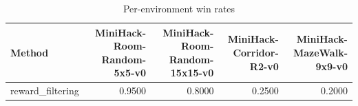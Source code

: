\begin{table}[htbp]
\centering
\caption{Per-environment win rates}
\label{tab:per-env}
\begin{tabular}{lrrrr}
\toprule
\textbf{Method} & \textbf{MiniHack-Room-Random-5x5-v0} & \textbf{MiniHack-Room-Random-15x15-v0} & \textbf{MiniHack-Corridor-R2-v0} & \textbf{MiniHack-MazeWalk-9x9-v0} \\
\midrule
reward\_filtering & 0.9500 & 0.8000 & 0.2500 & 0.2000 \\
\bottomrule
\end{tabular}
\end{table}